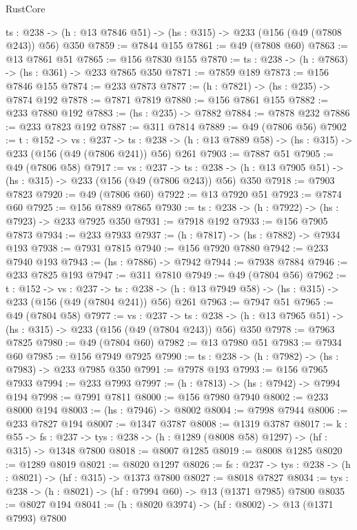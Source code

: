 \begin{lexlean}{RustCore}
\begin{coremodule}
  {ts : @238} -> (h : @13 @7846 @51) -> (hs : @315) -> @233 (@156 (@49 (@7808 @243)) @56) @350
@7859 := @7844 @155
@7861 := @49 (@7808 @60)
@7863 := @13 @7861 @51
@7865 := @156 @7830 @155
@7870 := {ts : @238} -> (h : @7863) -> (hs : @361) -> @233 @7865 @350
@7871 := @7859 @189
@7873 := @156 @7846 @155
@7874 := @233 @7873
@7877 := (h : @7821) -> (hs : @235) -> @7874 @192
@7878 := @7871 @7819
@7880 := @156 @7861 @155
@7882 := @233 @7880 @192
@7883 := (hs : @235) -> @7882
@7884 := @7878 @232
@7886 := @233 @7823 @192
@7887 := @311 @7814
@7889 := @49 (@7806 @56)
@7902 := {t : @152} ->
  {vs : @237} ->
  {ts : @238} -> (h : @13 @7889 @58) -> (hs : @315) -> @233 (@156 (@49 (@7806 @241)) @56) @261
@7903 := @7887 @51
@7905 := @49 (@7806 @58)
@7917 := {vs : @237} ->
  {ts : @238} -> (h : @13 @7905 @51) -> (hs : @315) -> @233 (@156 (@49 (@7806 @243)) @56) @350
@7918 := @7903 @7823
@7920 := @49 (@7806 @60)
@7922 := @13 @7920 @51
@7923 := @7874 @60
@7925 := @156 @7889 @7865
@7930 := {ts : @238} -> (h : @7922) -> (hs : @7923) -> @233 @7925 @350
@7931 := @7918 @192
@7933 := @156 @7905 @7873
@7934 := @233 @7933
@7937 := (h : @7817) -> (hs : @7882) -> @7934 @193
@7938 := @7931 @7815
@7940 := @156 @7920 @7880
@7942 := @233 @7940 @193
@7943 := (hs : @7886) -> @7942
@7944 := @7938 @7884
@7946 := @233 @7825 @193
@7947 := @311 @7810
@7949 := @49 (@7804 @56)
@7962 := {t : @152} ->
  {vs : @237} ->
  {ts : @238} -> (h : @13 @7949 @58) -> (hs : @315) -> @233 (@156 (@49 (@7804 @241)) @56) @261
@7963 := @7947 @51
@7965 := @49 (@7804 @58)
@7977 := {vs : @237} ->
  {ts : @238} -> (h : @13 @7965 @51) -> (hs : @315) -> @233 (@156 (@49 (@7804 @243)) @56) @350
@7978 := @7963 @7825
@7980 := @49 (@7804 @60)
@7982 := @13 @7980 @51
@7983 := @7934 @60
@7985 := @156 @7949 @7925
@7990 := {ts : @238} -> (h : @7982) -> (hs : @7983) -> @233 @7985 @350
@7991 := @7978 @193
@7993 := @156 @7965 @7933
@7994 := @233 @7993
@7997 := (h : @7813) -> (hs : @7942) -> @7994 @194
@7998 := @7991 @7811
@8000 := @156 @7980 @7940
@8002 := @233 @8000 @194
@8003 := (hs : @7946) -> @8002
@8004 := @7998 @7944
@8006 := @233 @7827 @194
@8007 := @1347 @3787
@8008 := @1319 @3787
@8017 := {k : @55} ->
  {fs : @237} -> {tys : @238} -> (h : @1289 (@8008 @58) @1297) -> (hf : @315) -> @1348 @7800
@8018 := @8007 @1285
@8019 := @8008 @1285
@8020 := @1289 @8019
@8021 := @8020 @1297
@8026 := {fs : @237} -> {tys : @238} -> (h : @8021) -> (hf : @315) -> @1373 @7800
@8027 := @8018 @7827
@8034 := {tys : @238} -> (h : @8021) -> (hf : @7994 @60) -> @13 (@1371 @7985) @7800
@8035 := @8027 @194
@8041 := (h : @8020 @3974) -> (hf : @8002) -> @13 (@1371 @7993) @7800

\end{coremodule}
\end{lexlean}

